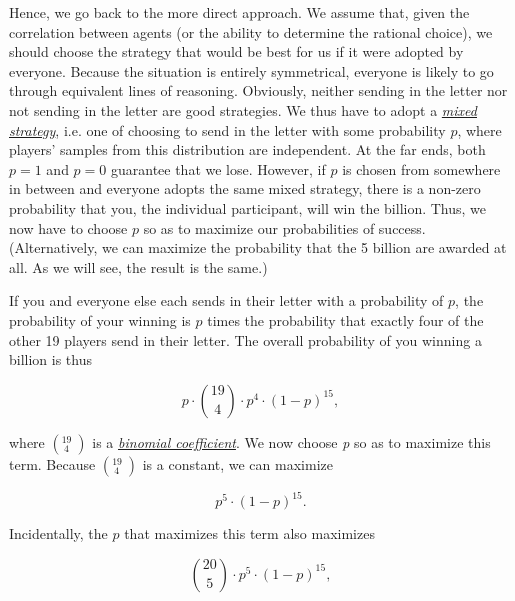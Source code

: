 Hence, we go back to the more direct approach. We assume that, given the
correlation between agents (or the ability to determine the rational
choice), we should choose the strategy that would be best for us if it
were adopted by everyone. Because the situation is entirely symmetrical,
everyone is likely to go through equivalent lines of reasoning.
Obviously, neither sending in the letter nor not sending in the letter
are good strategies. We thus have to adopt a
\href{https://en.wikipedia.org/wiki/Strategy_(game_theory)\#Pure_and_mixed_strategies}{\emph{mixed
strategy}}, i.e. one of choosing to send in the letter with some
probability \(p\), where players' samples from this distribution are
independent. At the far ends, both \(p = 1\) and \(p = 0\) guarantee
that we lose. However, if \(p\) is chosen from somewhere in between and
everyone adopts the same mixed strategy, there is a non-zero probability
that you, the individual participant, will win the billion. Thus, we now
have to choose \(p\) so as to maximize our probabilities of success.
(Alternatively, we can maximize the probability that the 5 billion are
awarded at all. As we will see, the result is the same.)

If you and everyone else each sends in their letter with a probability
of \(p\), the probability of your winning is \(p\) times the probability
that exactly four of the other 19 players send in their letter. The
overall probability of you winning a billion is thus

\begin{equation}
    p \cdot \binom{19}{4} \cdot p^{4} \cdot (1 - p)^{15},
    \label{eq:billion}
\end{equation}

where \(\left( {}_{\ 4}^{19}\  \right)\) is a
\href{https://en.wikipedia.org/wiki/Binomial_coefficient}{\emph{binomial
coefficient}}. We now choose \emph{p} so as to maximize this term.
Because \(\left( {}_{\ 4}^{19}\  \right)\) is a constant, we can
maximize

\begin{equation}
    p^{5} \cdot (1 - p)^{15}.
    \label{eq:max_p}
\end{equation}

Incidentally, the \(p\) that maximizes this term also maximizes

\begin{equation}
    \binom{20}{5} \cdot p^{5} \cdot (1 - p)^{15},
    \label{eq:max_p_2}
\end{equation}

